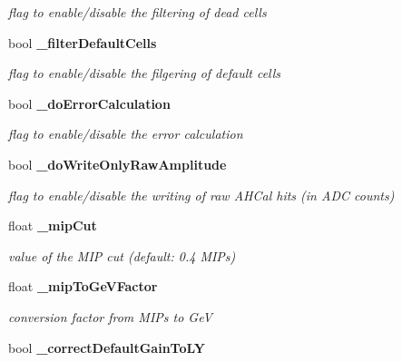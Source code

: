 \begin{DoxyCompactItemize}
\begin{DoxyCompactList}\small\item\em flag to enable/disable the filtering of dead cells \item\end{DoxyCompactList}\item 
bool {\bf \_\-filterDefaultCells}\label{classCALICE_1_1SiPMCalibrateProcessor_a0c500325fa0048790722ea2526a234e6}

\begin{DoxyCompactList}\small\item\em flag to enable/disable the filgering of default cells \item\end{DoxyCompactList}\item 
bool {\bf \_\-doErrorCalculation}\label{classCALICE_1_1SiPMCalibrateProcessor_af3d3d2927e61e4c13cbd4342c25687ae}

\begin{DoxyCompactList}\small\item\em flag to enable/disable the error calculation \item\end{DoxyCompactList}\item 
bool {\bf \_\-doWriteOnlyRawAmplitude}\label{classCALICE_1_1SiPMCalibrateProcessor_ab60bc164b141b85dc9637dab5d88ff52}

\begin{DoxyCompactList}\small\item\em flag to enable/disable the writing of raw AHCal hits (in ADC counts) \item\end{DoxyCompactList}\item 
float {\bf \_\-mipCut}\label{classCALICE_1_1SiPMCalibrateProcessor_ae7a5dacf9857a1f45074aa7668af970a}

\begin{DoxyCompactList}\small\item\em value of the MIP cut (default: 0.4 MIPs) \item\end{DoxyCompactList}\item 
float {\bf \_\-mipToGeVFactor}\label{classCALICE_1_1SiPMCalibrateProcessor_aad74cd9ffd52b8b04928f16750382f74}

\begin{DoxyCompactList}\small\item\em conversion factor from MIPs to GeV \item\end{DoxyCompactList}\item 
bool {\bfseries \_\-correctDefaultGainToLY}\label{classCALICE_1_1SiPMCalibrateProcessor_a9e8a86f294ee86393f3c413bb25fc686}


\end{DoxyCompactItemize}
